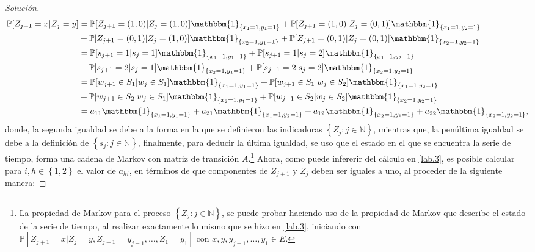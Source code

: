 \documentclass[10.5pt,notitlepage]{article}
\newenvironment{solucion}
  {\begin{proof}[Solución]}
  {\end{proof}}
\newcommand{\PP}{\mathbb{P}}
\newcommand{\NN}{\mathbb{N}}
\newcommand{\kis}[1]{\left\{ #1 \right\}}
\theoremstyle{plain}
\begin{document}
\begin{solucion}
{\tiny
\begin{align}\label{lab.3}
\PP[Z_{j+1} = x | Z_{j} =y] &= \PP[Z_{j+1} = (1,0) | Z_{j} =(1,0)]\mathbbm{1}_{\kis{x_1 = 1, y_1 = 1}} + \PP[Z_{j+1} = (1,0) | Z_{j} =(0,1)]\mathbbm{1}_{\kis{x_1 = 1, y_2 = 1}} \\
&+\PP[Z_{j+1} = (0,1) | Z_{j} =(1,0)]\mathbbm{1}_{\kis{x_2 = 1, y_1 = 1}} + \PP[Z_{j+1} = (0,1) | Z_{j} =(0,1)]\mathbbm{1}_{\kis{x_2 = 1, y_2 = 1}}\nonumber \\
                            &= \PP[s_{j+1}= 1 | s_{j} = 1]\mathbbm{1}_{\kis{x_1 = 1, y_1 = 1}} + \PP[s_{j + 1} = 1 | s_{j} = 2]\mathbbm{1}_{\kis{x_1 = 1, y_2 = 1}}\nonumber \\
&+\PP[s_{j + 1} = 2 | s_{j} =1]\mathbbm{1}_{\kis{x_2 = 1, y_1 = 1}} + \PP[s_{j+1} = 2 | s_{j} = 2]\mathbbm{1}_{\kis{x_2 = 1, y_2 = 1}} \nonumber\\    
                            &= \PP[w_{j+1} \in S_{1} | w_{j} \in S_{1}]\mathbbm{1}_{\kis{x_1 = 1, y_1 = 1}} + \PP[w_{j+1} \in S_{1} | w_{j} \in S_{2}]\mathbbm{1}_{\kis{x_1 = 1, y_2 = 1}} \nonumber\\
&+\PP[w_{j+1} \in S_{2} | w_{j} \in S_{1}]\mathbbm{1}_{\kis{x_2 = 1, y_1 = 1}} + \PP[w_{j+1} \in S_{2} | w_{j} \in S_{2}]\mathbbm{1}_{\kis{x_2 = 1, y_2 = 1}} \nonumber\\
                            &= a_{11}\mathbbm{1}_{\kis{x_1 = 1, y_1 = 1}} + a_{21}\mathbbm{1}_{\kis{x_1 = 1, y_2 = 1}} +a_{12}\mathbbm{1}_{\kis{x_2 = 1, y_1 = 1}} + a_{22}\mathbbm{1}_{\kis{x_2 = 1, y_2 = 1}},
\end{align}}%
donde, la segunda igualdad se debe a la forma en la que se definieron las indicadoras \(\kis{Z_{j} : j \in \NN}\), mientras que, la penúltima igualdad se debe a la definición de \(\kis{s_{j}: j \in \NN}\), finalmente, para deducir la última igualdad, se uso que el estado en el que se encuentra la serie de tiempo, forma una cadena de Markov con matriz de transición \(A\).\footnote{La propiedad de Markov para el proceso \(\kis{Z_{j} : j \in \NN}\), se puede probar haciendo uso de la propiedad de Markov que describe el estado de la serie de tiempo, al realizar exactamente lo mismo que se hizo en \eqref{lab.3}, iniciando con \(\PP[Z_{j+1} = x | Z_{j} =y, Z_{j-1} = y_{j-1}, \hdots, Z_{1} = y_1]\) con \(x,y,y_{j-1}, \hdots, y_1 \in E\).} Ahora, como puede infererir del cálculo en \eqref{lab.3}, es posible calcular para \(i,h\in\kis{1,2}\) el valor de \(a_{hi}\), en términos de que componentes de \(Z_{j+1}\) y \(Z_{j}\) deben ser iguales a uno, al proceder de la siguiente manera: 

\end{solucion}
\end{document}
